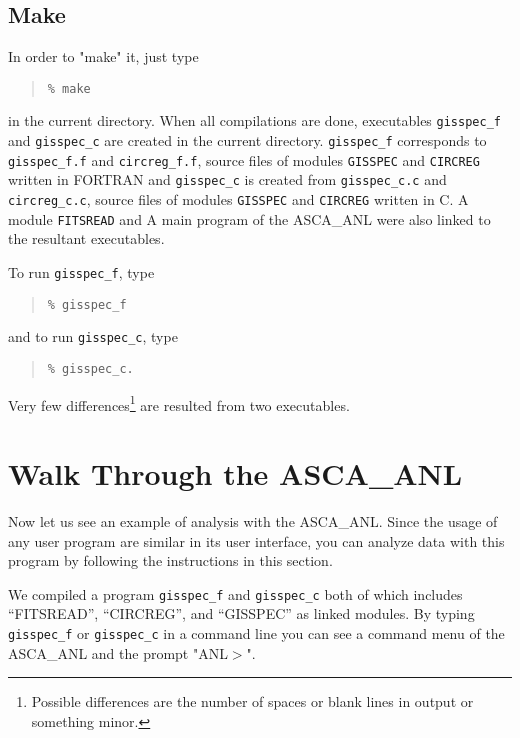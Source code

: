 \subsection{Make}
In order to "make" it,
just type
\begin{quote}\baselineskip 3.2mm\begin{verbatim}
% make
\end{verbatim}\end{quote}
in the current directory.
When all compilations are done,
executables {\tt gisspec\_f} and {\tt gisspec\_c}
are created in the current directory.
{\tt gisspec\_f} corresponds to {\tt gisspec\_f.f} and {\tt circreg\_f.f},
source files of modules {\tt GISSPEC} and {\tt CIRCREG} written in FORTRAN
and {\tt gisspec\_c} is created from {\tt gisspec\_c.c} and {\tt circreg\_c.c},
source files of modules {\tt GISSPEC} and {\tt CIRCREG} written in C.
A module {\tt FITSREAD} and A main program of the ASCA\_ANL
were also linked to the resultant executables.

To run {\tt gisspec\_f},
type
\begin{quote}\baselineskip 3.2mm\begin{verbatim}
% gisspec_f
\end{verbatim}\end{quote}
and to run {\tt gisspec\_c},
type
\begin{quote}\baselineskip 3.2mm\begin{verbatim}
% gisspec_c.
\end{verbatim}\end{quote}
Very few differences\footnote{
Possible differences are the number of spaces or blank lines in output
or something minor.
} are resulted from two executables.

\section{Walk Through the ASCA\_ANL}
\label{sec:walk-through}
Now let us see an example of analysis with the ASCA\_ANL.
Since the usage of any user program are similar in its user interface,
you can analyze data with this program
by following the instructions in this section.

We compiled a program {\tt gisspec\_f} and {\tt gisspec\_c}
both of which includes
``FITSREAD'',
``CIRCREG'',
and ``GISSPEC'' as linked modules.
By typing {\tt gisspec\_f} or {\tt gisspec\_c} in a command line
you can see a command menu of the ASCA\_ANL and the prompt "ANL$>$".

